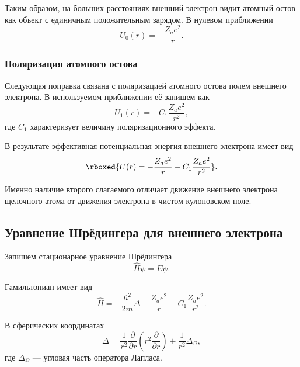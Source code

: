 \documentclass[../final.tex]{subfiles}
\begin{document}
Таким образом, на больших расстояниях внешний электрон видит атомный остов
как объект с единичным положительным зарядом. В нулевом приближении
\begin{equation*}
    U_0(r)
    =
    -\frac{Z_a e^2}{r}.
\end{equation*}

\subsubsection{Поляризация атомного остова}

Следующая поправка связана с поляризацией атомного остова полем внешнего
электрона. В используемом приближении её запишем как
\begin{equation*}
    U_1(r)
    =
    -C_1\frac{Z_a e^2}{r^2},
\end{equation*}
где \(C_1\) характеризует величину поляризационного эффекта.

В результате эффективная потенциальная энергия внешнего электрона имеет вид
\begin{equation*}
    \rboxed{
        U(r)
        =
        -\frac{Z_a e^2}{r}
        -
        C_1\frac{Z_a e^2}{r^2}
    }.
\end{equation*}

Именно наличие второго слагаемого отличает движение внешнего электрона
щелочного атома от движения электрона в чистом кулоновском поле.

\subsection{Уравнение Шрёдингера для внешнего электрона}

Запишем стационарное уравнение Шрёдингера
\begin{equation*}
    \hat H\psi=E\psi.
\end{equation*}

Гамильтониан имеет вид
\begin{equation*}
    \hat H
    =
    -\frac{\hbar^2}{2m}\Delta
    -
    \frac{Z_a e^2}{r}
    -
    C_1\frac{Z_a e^2}{r^2}.
\end{equation*}

В сферических координатах
\begin{equation*}
    \Delta
    =
    \frac{1}{r^2}
    \frac{\partial}{\partial r}
    \left(
        r^2\frac{\partial}{\partial r}
    \right)
    +
    \frac{1}{r^2}\Delta_\Omega,
\end{equation*}
где \(\Delta_\Omega\) --- угловая часть оператора Лапласа.
\end{document}
